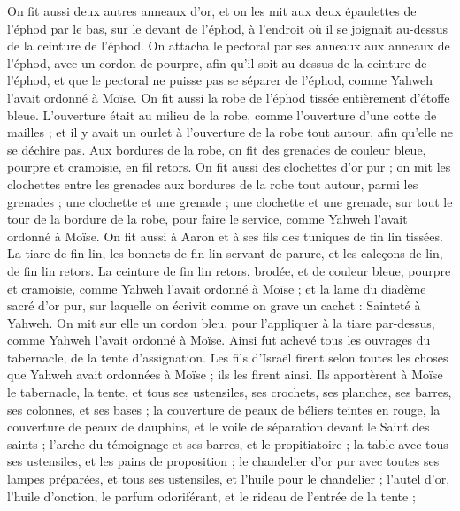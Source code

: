 \begin{multicols}{2}
On fit aussi deux autres anneaux d'or, et on les mit aux deux épaulettes de l'éphod par le bas, sur le devant de l'éphod, à l'endroit où il se joignait au-dessus de la ceinture de l'éphod.
On attacha le pectoral par ses anneaux aux anneaux de l'éphod, avec un cordon de pourpre, afin qu'il soit au-dessus de la ceinture de l'éphod, et que le pectoral ne puisse pas se séparer de l'éphod, comme Yahweh l'avait ordonné à Moïse.
On fit aussi la robe de l'éphod tissée entièrement d’étoffe bleue.
L'ouverture était au milieu de la robe, comme l'ouverture d’une cotte de mailles ; et il y avait un ourlet à l'ouverture de la robe tout autour, afin qu'elle ne se déchire pas.
Aux bordures de la robe, on fit des grenades de couleur bleue, pourpre et cramoisie, en fil retors.
On fit aussi des clochettes d’or pur ; on mit les clochettes entre les grenades aux bordures de la robe tout autour, parmi les grenades ;
une clochette et une grenade ; une clochette et une grenade, sur tout le tour de la bordure de la robe, pour faire le service, comme Yahweh l'avait ordonné à Moïse.
On fit aussi à Aaron et à ses fils des tuniques de fin lin tissées.
La tiare de fin lin, les bonnets de fin lin servant de parure, et les caleçons de lin, de fin lin retors.
La ceinture de fin lin retors, brodée, et de couleur bleue, pourpre et cramoisie, comme Yahweh l'avait ordonné à Moïse ;
et la lame du diadème sacré d’or pur, sur laquelle on écrivit comme on grave un cachet : Sainteté à Yahweh.
On mit sur elle un cordon bleu, pour l'appliquer à la tiare par-dessus, comme Yahweh l'avait ordonné à Moïse.
Ainsi fut achevé tous les ouvrages du tabernacle, de la tente d'assignation. Les fils d'Israël firent selon toutes les choses que Yahweh avait ordonnées à Moïse ; ils les firent ainsi.
Ils apportèrent à Moïse le tabernacle, la tente, et tous ses ustensiles, ses crochets, ses planches, ses barres, ses colonnes, et ses bases ;
la couverture de peaux de béliers teintes en rouge, la couverture de peaux de dauphins, et le voile de séparation devant le Saint des saints ;
l'arche du témoignage et ses barres, et le propitiatoire ;
la table avec tous ses ustensiles, et les pains de proposition ;
le chandelier d’or pur avec toutes ses lampes préparées, et tous ses ustensiles, et l'huile pour le chandelier ;
l'autel d'or, l'huile d'onction, le parfum odoriférant, et le rideau de l’entrée de la tente ;

\end{multicols}

